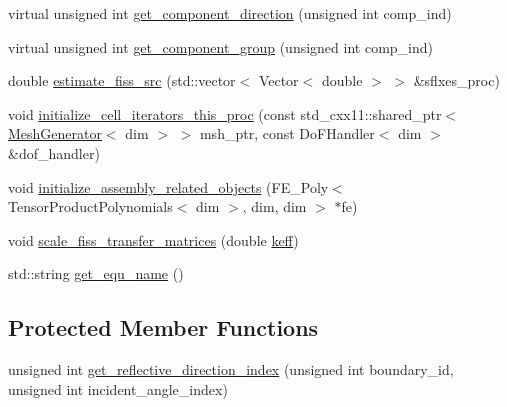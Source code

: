 \begin{DoxyCompactItemize}
\item 
virtual unsigned int \hyperlink{class_equation_base_a4feaa86bdd6e84c4fc9195df67890c6a}{get\+\_\+component\+\_\+direction} (unsigned int comp\+\_\+ind)
\item 
virtual unsigned int \hyperlink{class_equation_base_a43a783f117149eac90a770d471cd7671}{get\+\_\+component\+\_\+group} (unsigned int comp\+\_\+ind)
\item 
double \hyperlink{class_equation_base_a1f36aebd8d54a082db3b2d2a621e67d6}{estimate\+\_\+fiss\+\_\+src} (std\+::vector$<$ Vector$<$ double $>$ $>$ \&sflxes\+\_\+proc)
\item 
void \hyperlink{class_equation_base_a4268bd83e1858fb6326c9b67851e85cc}{initialize\+\_\+cell\+\_\+iterators\+\_\+this\+\_\+proc} (const std\+\_\+cxx11\+::shared\+\_\+ptr$<$ \hyperlink{class_mesh_generator}{Mesh\+Generator}$<$ dim $>$ $>$ msh\+\_\+ptr, const Do\+F\+Handler$<$ dim $>$ \&dof\+\_\+handler)
\item 
void \hyperlink{class_equation_base_a932c91c91d2b758a155548e5b20ed1ff}{initialize\+\_\+assembly\+\_\+related\+\_\+objects} (F\+E\+\_\+\+Poly$<$ Tensor\+Product\+Polynomials$<$ dim $>$, dim, dim $>$ $\ast$fe)
\item 
void \hyperlink{class_equation_base_a13947db6be48085b9dca97117c73b5ca}{scale\+\_\+fiss\+\_\+transfer\+\_\+matrices} (double \hyperlink{class_equation_base_ab3cf94dc329f486555f89bdb0dd94ed6}{keff})
\item 
std\+::string \hyperlink{class_equation_base_abc4842a38ebb180b57ae11ec1325535c}{get\+\_\+equ\+\_\+name} ()
\end{DoxyCompactItemize}
\subsection*{Protected Member Functions}
\begin{DoxyCompactItemize}
\item 
unsigned int \hyperlink{class_equation_base_a7c46fc281a4040a89bbd97ccf0f46ac7}{get\+\_\+reflective\+\_\+direction\+\_\+index} (unsigned int boundary\+\_\+id, unsigned int incident\+\_\+angle\+\_\+index)
\end{DoxyCompactItemize}
